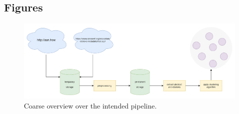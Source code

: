 
\begin{appendices}
    \section{Figures}
    \begin{figure}[ht]
        \centering
        \includegraphics[width=\textwidth,keepaspectratio]{figures/pipeline}
        \caption[]{Coarse overview over the intended pipeline.}
        \label{fig:pipeline}
    \end{figure}
  \end{appendices}